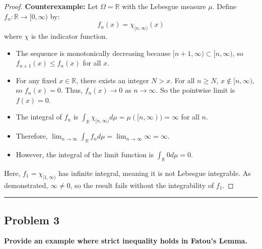 \documentclass[11pt]{article}
\begin{document}
\begin{proof}
\textbf{Counterexample:} Let $\Omega = \mathbb{R}$ with the Lebesgue measure $\mu$. Define $f_n: \mathbb{R} \to [0, \infty)$ by:
\[ f_n(x) = \chi_{[n, \infty)}(x) \]
where $\chi$ is the indicator function.
\begin{itemize}
    \item The sequence is monotonically decreasing because $[n+1, \infty) \subset [n, \infty)$, so $f_{n+1}(x) \le f_n(x)$ for all $x$.
    \item For any fixed $x \in \mathbb{R}$, there exists an integer $N > x$. For all $n \ge N$, $x \notin [n, \infty)$, so $f_n(x) = 0$. Thus, $f_n(x) \to 0$ as $n \to \infty$. So the pointwise limit is $f(x) = 0$.
    \item The integral of $f_n$ is $\int_{\mathbb{R}} \chi_{[n, \infty)} d\mu = \mu([n, \infty)) = \infty$ for all $n$.
    \item Therefore, $\lim_{n \to \infty} \int_{\mathbb{R}} f_n d\mu = \lim_{n \to \infty} \infty = \infty$.
    \item However, the integral of the limit function is $\int_{\mathbb{R}} 0 d\mu = 0$.
\end{itemize}
Here, $f_1 = \chi_{[1, \infty)}$ has infinite integral, meaning it is not Lebesgue integrable. As demonstrated, $\infty \neq 0$, so the result fails without the integrability of $f_1$.
\end{proof}

\vspace{1em}
\hrule
\vspace{1em}

\subsection*{Problem 3}
\textbf{Provide an example where strict inequality holds in Fatou's Lemma.}
\end{document}
